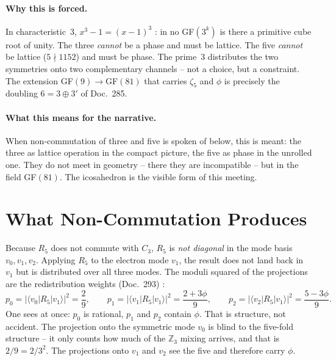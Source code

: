 \paragraph{Why this is forced.}
In characteristic~3, $x^3-1=(x-1)^3$ \EM: in no GF$(3^k)$ is there a primitive
cube root of unity. The three \emph{cannot} be a phase and must be lattice.
The five \emph{cannot} be lattice ($5\nmid1152$) and must be phase. The prime~3
distributes the two symmetries onto two complementary channels -- not a
choice, but a constraint. The extension GF$(9)\to$GF$(81)$ that carries
$\zeta_5$ and $\phi$ is precisely the doubling $6=3\oplus3'$ of Doc.~285.

\paragraph{What this means for the narrative.}
When non-commutation of three and five is spoken of below, this is meant: the
three as lattice operation in the compact picture, the five as phase in the
unrolled one. They do not meet in geometry -- there they are incompatible --
but in the field GF$(81)$. The icosahedron is the visible form of this
meeting.

\section{What Non-Commutation Produces}

Because $R_5$ does not commute with $C_3$, $R_5$ is \emph{not diagonal} in the
mode basis $v_0,v_1,v_2$. Applying $R_5$ to the electron mode $v_1$, the result
does not land back in $v_1$ but is distributed over all three modes. The moduli
squared of the projections are the redistribution weights (Doc.~293) \BM:
\[
  p_0 = |\langle v_0|R_5|v_1\rangle|^2 = \frac{2}{9}, \qquad
  p_1 = |\langle v_1|R_5|v_1\rangle|^2 = \frac{2+3\phi}{9}, \qquad
  p_2 = |\langle v_2|R_5|v_1\rangle|^2 = \frac{5-3\phi}{9}.
\]
One sees at once: $p_0$ is rational, $p_1$ and $p_2$ contain $\phi$. That is
structure, not accident. The projection onto the symmetric mode $v_0$ is blind
to the five-fold structure -- it only counts how much of the $\mathbb{Z}_3$
mixing arrives, and that is $2/9 = 2/3^2$. The projections onto $v_1$ and $v_2$
see the five and therefore carry $\phi$.


